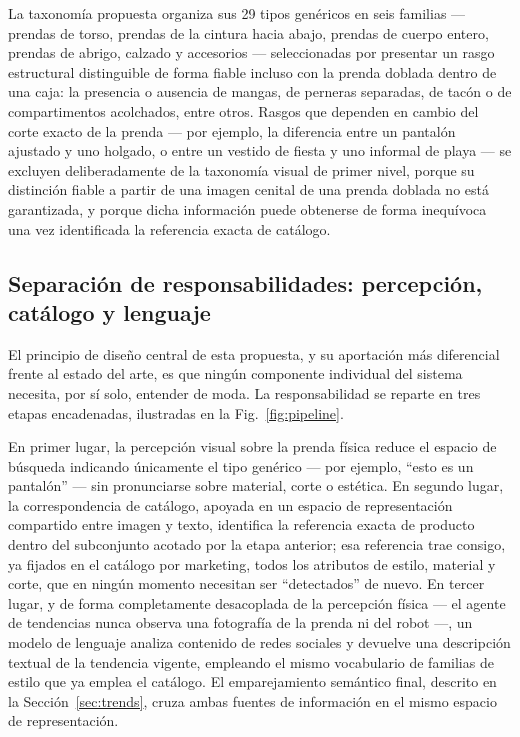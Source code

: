\documentclass[conference]{IEEEtran}
\begin{document}
La taxonomía propuesta organiza sus 29 tipos genéricos en seis familias \cite{guo2019imaterialist, jia2020fashionpedia}
--- prendas de torso, prendas de la cintura hacia abajo, prendas de cuerpo
entero, prendas de abrigo, calzado y accesorios --- seleccionadas por
presentar un rasgo estructural distinguible de forma fiable incluso con la
prenda doblada dentro de una caja: la presencia o ausencia de mangas, de
perneras separadas, de tacón o de compartimentos acolchados, entre otros.
Rasgos que dependen en cambio del corte exacto de la prenda --- por ejemplo,
la diferencia entre un pantalón ajustado y uno holgado, o entre un vestido
de fiesta y uno informal de playa --- se excluyen deliberadamente de la
taxonomía visual de primer nivel, porque su distinción fiable a partir de
una imagen cenital de una prenda doblada no está garantizada, y porque dicha
información puede obtenerse de forma inequívoca una vez identificada la
referencia exacta de catálogo.

\subsection{Separación de responsabilidades: percepción, catálogo y lenguaje}

El principio de diseño central de esta propuesta, y su aportación más
diferencial frente al estado del arte, es que ningún componente individual
del sistema necesita, por sí solo, entender de moda. La responsabilidad se
reparte en tres etapas encadenadas, ilustradas en la
Fig.~\ref{fig:pipeline}.

En primer lugar, la percepción visual sobre la prenda física reduce el
espacio de búsqueda indicando únicamente el tipo genérico --- por ejemplo,
``esto es un pantalón'' --- sin pronunciarse sobre material, corte o
estética. En segundo lugar, la correspondencia de catálogo, apoyada en un
espacio de representación compartido entre imagen y texto, identifica la
referencia exacta de producto dentro del subconjunto acotado por la etapa
anterior; esa referencia trae consigo, ya fijados en el catálogo por
marketing, todos los atributos de estilo, material y corte, que en ningún
momento necesitan ser ``detectados'' de nuevo. En tercer lugar, y de forma
completamente desacoplada de la percepción física --- el agente de
tendencias nunca observa una fotografía de la prenda ni del robot ---, un
modelo de lenguaje analiza contenido de redes sociales y devuelve una
descripción textual de la tendencia vigente, empleando el mismo vocabulario
de familias de estilo que ya emplea el catálogo. El emparejamiento semántico
final, descrito en la Sección~\ref{sec:trends}, cruza ambas fuentes de
información en el mismo espacio de representación.
\end{document}

